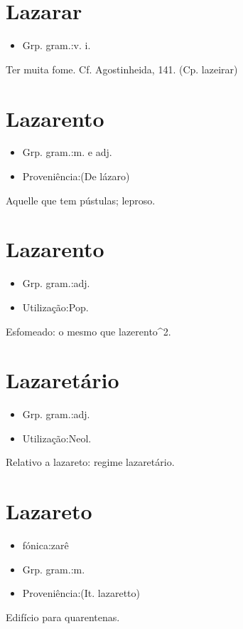 \section{Lazarar}
\begin{itemize}
\item {Grp. gram.:v. i.}
\end{itemize}
Ter muita fome. Cf. \textunderscore Agostinheida\textunderscore , 141.
(Cp. \textunderscore lazeirar\textunderscore )
\section{Lazarento}
\begin{itemize}
\item {Grp. gram.:m.  e  adj.}
\end{itemize}
\begin{itemize}
\item {Proveniência:(De \textunderscore lázaro\textunderscore )}
\end{itemize}
Aquelle que tem pústulas; leproso.
\section{Lazarento}
\begin{itemize}
\item {Grp. gram.:adj.}
\end{itemize}
\begin{itemize}
\item {Utilização:Pop.}
\end{itemize}
Esfomeado: o mesmo que \textunderscore lazerento\textunderscore ^2.
\section{Lazaretário}
\begin{itemize}
\item {Grp. gram.:adj.}
\end{itemize}
\begin{itemize}
\item {Utilização:Neol.}
\end{itemize}
Relativo a lazareto: \textunderscore regime lazaretário\textunderscore .
\section{Lazareto}
\begin{itemize}
\item {fónica:zarê}
\end{itemize}
\begin{itemize}
\item {Grp. gram.:m.}
\end{itemize}
\begin{itemize}
\item {Proveniência:(It. \textunderscore lazaretto\textunderscore )}
\end{itemize}
Edifício para quarentenas.
